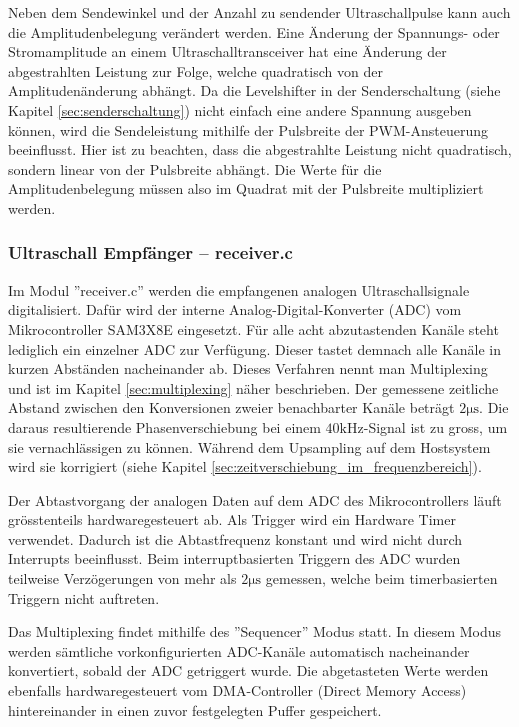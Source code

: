 Neben dem Sendewinkel und der Anzahl zu sendender Ultraschallpulse kann auch die Amplitudenbelegung verändert werden. Eine Änderung der Spannungs- oder Stromamplitude an einem Ultraschalltransceiver hat eine Änderung der abgestrahlten Leistung zur Folge, welche quadratisch von der Amplitudenänderung abhängt. Da die Levelshifter in der Senderschaltung (siehe Kapitel \ref{sec:senderschaltung}) nicht einfach eine andere Spannung ausgeben können, wird die Sendeleistung mithilfe der Pulsbreite der PWM-Ansteuerung beeinflusst. Hier ist zu beachten, dass die abgestrahlte Leistung nicht quadratisch, sondern linear von der Pulsbreite abhängt. Die Werte für die Amplitudenbelegung müssen also im Quadrat mit der Pulsbreite multipliziert werden.


\subsubsection{Ultraschall Empfänger -- receiver.c}\label{sec:ultraschall_empfaenger}
Im Modul ''receiver.c'' werden die empfangenen analogen Ultraschallsignale digitalisiert. Dafür wird der interne Analog-Digital-Konverter (ADC) vom Mikrocontroller SAM3X8E eingesetzt. Für alle acht abzutastenden Kanäle steht lediglich ein einzelner ADC zur Verfügung. Dieser tastet demnach alle Kanäle in kurzen Abständen nacheinander ab. Dieses Verfahren nennt man Multiplexing und ist im Kapitel \ref{sec:multiplexing} näher beschrieben. Der gemessene zeitliche Abstand zwischen den Konversionen zweier benachbarter Kanäle beträgt $2 \mathrm{\mu s}$. Die daraus resultierende Phasenverschiebung bei einem $40 \mathrm{kHz}$-Signal ist zu gross, um sie vernachlässigen zu können. Während dem Upsampling auf dem Hostsystem wird sie korrigiert (siehe Kapitel \ref{sec:zeitverschiebung_im_frequenzbereich}).

Der Abtastvorgang der analogen Daten auf dem ADC des Mikrocontrollers läuft grösstenteils hardwaregesteuert ab. Als Trigger wird ein Hardware Timer verwendet. Dadurch ist die Abtastfrequenz konstant und wird nicht durch Interrupts beeinflusst. Beim interruptbasierten Triggern des ADC wurden teilweise Verzögerungen von mehr als $2 \mathrm{\mu s}$ gemessen, welche beim timerbasierten Triggern nicht auftreten.

Das Multiplexing findet mithilfe des ''Sequencer'' Modus statt. In diesem Modus werden sämtliche vorkonfigurierten ADC-Kanäle automatisch nacheinander konvertiert, sobald der ADC ge\-triggert wurde. Die abgetasteten Werte werden ebenfalls hardwaregesteuert vom DMA-Controller (Direct Memory Access) hintereinander in einen zuvor festgelegten Puffer gespeichert.

